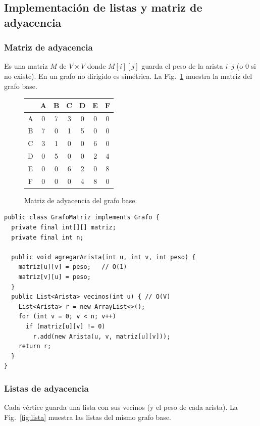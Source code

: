 \documentclass[conference]{IEEEtran}
\begin{document}
\subsection{Implementación de listas y matriz de adyacencia}
\label{sec:repr}

\subsubsection{Matriz de adyacencia}
Es una matriz $M$ de $V\times V$ donde $M[i][j]$ guarda el peso de la arista $i$--$j$ (o $0$ si no existe). En un grafo no dirigido es simétrica. La Fig.~\ref{fig:matriz} muestra la matriz del grafo base.

\begin{figure}[t]
\centering
\renewcommand{\arraystretch}{1.1}
\begin{tabular}{c|cccccc}
   & A & B & C & D & E & F \\ \hline
 A & 0 & 7 & 3 & 0 & 0 & 0 \\
 B & 7 & 0 & 1 & 5 & 0 & 0 \\
 C & 3 & 1 & 0 & 0 & 6 & 0 \\
 D & 0 & 5 & 0 & 0 & 2 & 4 \\
 E & 0 & 0 & 6 & 2 & 0 & 8 \\
 F & 0 & 0 & 0 & 4 & 8 & 0
\end{tabular}
\caption{Matriz de adyacencia del grafo base.}
\label{fig:matriz}
\end{figure}

\begin{lstlisting}[caption={Núcleo de GrafoMatriz.java}]
public class GrafoMatriz implements Grafo {
  private final int[][] matriz;
  private final int n;

  public void agregarArista(int u, int v, int peso) {
    matriz[u][v] = peso;   // O(1)
    matriz[v][u] = peso;
  }
  public List<Arista> vecinos(int u) { // O(V)
    List<Arista> r = new ArrayList<>();
    for (int v = 0; v < n; v++)
      if (matriz[u][v] != 0)
        r.add(new Arista(u, v, matriz[u][v]));
    return r;
  }
}
\end{lstlisting}

\subsubsection{Listas de adyacencia}
Cada vértice guarda una lista con sus vecinos (y el peso de cada arista). La Fig.~\ref{fig:lista} muestra las listas del mismo grafo base.
\end{document}
